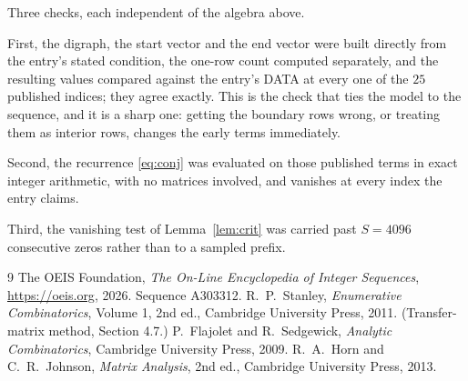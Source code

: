 \documentclass[11pt,a4paper]{article}
\theoremstyle{plain}
\theoremstyle{definition}
\begin{document}
Three checks, each independent of the algebra above.

First, the digraph, the start vector and the end vector were built directly from the
entry's stated condition, the one-row count computed separately, and the resulting values
compared against the entry's DATA at every one of the $25$ published indices; they
agree exactly. This is the check that ties the model to the sequence, and it is a sharp one:
getting the boundary rows wrong, or treating them as interior rows, changes the early terms
immediately.

Second, the recurrence \eqref{eq:conj} was evaluated on those published terms in exact
integer arithmetic, with no matrices involved, and vanishes at every index the entry claims.

Third, the vanishing test of Lemma~\ref{lem:crit} was carried past $S=4096$ consecutive
zeros rather than to a sampled prefix.

\begin{thebibliography}{9}
 The OEIS Foundation, \emph{The On-Line Encyclopedia of Integer
Sequences}, \url{https://oeis.org}, 2026. Sequence A303312.
 R.~P.~Stanley, \emph{Enumerative Combinatorics}, Volume 1, 2nd ed.,
Cambridge University Press, 2011. (Transfer-matrix method, Section 4.7.)
 P.~Flajolet and R.~Sedgewick, \emph{Analytic Combinatorics}, Cambridge
University Press, 2009.
 R.~A.~Horn and C.~R.~Johnson, \emph{Matrix Analysis}, 2nd ed., Cambridge
University Press, 2013.
\end{thebibliography}
\end{document}
